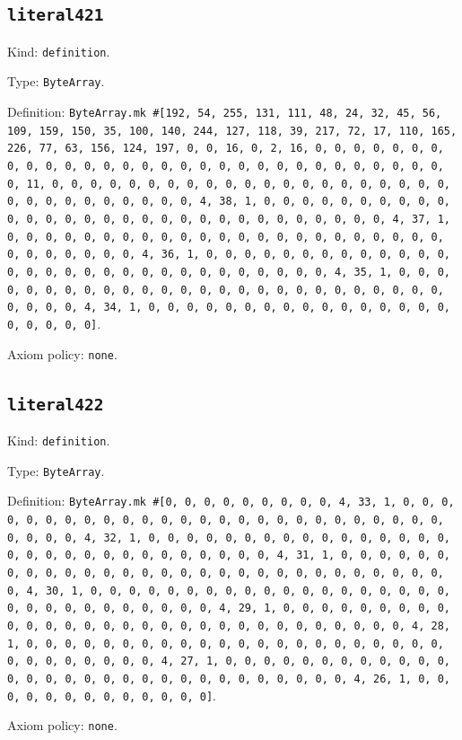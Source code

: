 \documentclass[11pt]{article}
\begin{document}
\subsection*{\texttt{literal421}}
\noindent Kind: \texttt{definition}.\par
\noindent Type: \texttt{ByteArray}.\par
\noindent Definition: \texttt{ByteArray.mk \#[192, 54, 255, 131, 111, 48, 24, 32, 45, 56, 109, 159, 150, 35, 100, 140, 244, 127, 118, 39, 217, 72, 17, 110, 165, 226, 77, 63, 156, 124, 197, 0, 0, 16, 0, 2, 16, 0, 0, 0, 0, 0, 0, 0, 0, 0, 0, 0, 0, 0, 0, 0, 0, 0, 0, 0, 0, 0, 0, 0, 0, 0, 0, 0, 0, 0, 0, 0, 11, 0, 0, 0, 0, 0, 0, 0, 0, 0, 0, 0, 0, 0, 0, 0, 0, 0, 0, 0, 0, 0, 0, 0, 0, 0, 0, 0, 0, 0, 0, 0, 4, 38, 1, 0, 0, 0, 0, 0, 0, 0, 0, 0, 0, 0, 0, 0, 0, 0, 0, 0, 0, 0, 0, 0, 0, 0, 0, 0, 0, 0, 0, 0, 0, 4, 37, 1, 0, 0, 0, 0, 0, 0, 0, 0, 0, 0, 0, 0, 0, 0, 0, 0, 0, 0, 0, 0, 0, 0, 0, 0, 0, 0, 0, 0, 0, 0, 4, 36, 1, 0, 0, 0, 0, 0, 0, 0, 0, 0, 0, 0, 0, 0, 0, 0, 0, 0, 0, 0, 0, 0, 0, 0, 0, 0, 0, 0, 0, 0, 0, 4, 35, 1, 0, 0, 0, 0, 0, 0, 0, 0, 0, 0, 0, 0, 0, 0, 0, 0, 0, 0, 0, 0, 0, 0, 0, 0, 0, 0, 0, 0, 0, 0, 4, 34, 1, 0, 0, 0, 0, 0, 0, 0, 0, 0, 0, 0, 0, 0, 0, 0, 0, 0, 0, 0, 0, 0]}.\par
\noindent Axiom policy: \texttt{none}.\par
\subsection*{\texttt{literal422}}
\noindent Kind: \texttt{definition}.\par
\noindent Type: \texttt{ByteArray}.\par
\noindent Definition: \texttt{ByteArray.mk \#[0, 0, 0, 0, 0, 0, 0, 0, 0, 4, 33, 1, 0, 0, 0, 0, 0, 0, 0, 0, 0, 0, 0, 0, 0, 0, 0, 0, 0, 0, 0, 0, 0, 0, 0, 0, 0, 0, 0, 0, 0, 0, 4, 32, 1, 0, 0, 0, 0, 0, 0, 0, 0, 0, 0, 0, 0, 0, 0, 0, 0, 0, 0, 0, 0, 0, 0, 0, 0, 0, 0, 0, 0, 0, 0, 4, 31, 1, 0, 0, 0, 0, 0, 0, 0, 0, 0, 0, 0, 0, 0, 0, 0, 0, 0, 0, 0, 0, 0, 0, 0, 0, 0, 0, 0, 0, 0, 0, 4, 30, 1, 0, 0, 0, 0, 0, 0, 0, 0, 0, 0, 0, 0, 0, 0, 0, 0, 0, 0, 0, 0, 0, 0, 0, 0, 0, 0, 0, 0, 0, 0, 4, 29, 1, 0, 0, 0, 0, 0, 0, 0, 0, 0, 0, 0, 0, 0, 0, 0, 0, 0, 0, 0, 0, 0, 0, 0, 0, 0, 0, 0, 0, 0, 0, 4, 28, 1, 0, 0, 0, 0, 0, 0, 0, 0, 0, 0, 0, 0, 0, 0, 0, 0, 0, 0, 0, 0, 0, 0, 0, 0, 0, 0, 0, 0, 0, 0, 4, 27, 1, 0, 0, 0, 0, 0, 0, 0, 0, 0, 0, 0, 0, 0, 0, 0, 0, 0, 0, 0, 0, 0, 0, 0, 0, 0, 0, 0, 0, 0, 0, 4, 26, 1, 0, 0, 0, 0, 0, 0, 0, 0, 0, 0, 0, 0, 0]}.\par
\noindent Axiom policy: \texttt{none}.\par
\end{document}
